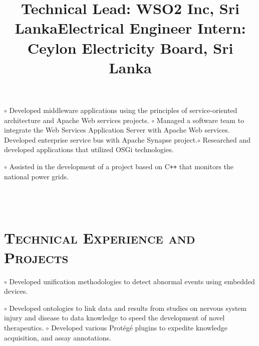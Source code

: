 \begin{resume}
\title{\textbf{Technical Lead: WSO2 Inc, Sri Lanka}}
\begin{position}
$\circ$ Developed middleware applications using the principles of service-oriented 
architecture and Apache Web services projects.   \newline $\circ$ 
Managed a software team to integrate the Web Services Application Server with Apache Web services. 
Developed enterprise service bus with Apache Synapse project.\newline $\circ$ Researched and 
developed 
applications that utilized OSGi technologies.
\end{position}


\title{\textbf{Electrical Engineer Intern: Ceylon Electricity Board, Sri Lanka}}
\begin{position}
$\circ$ Assisted in the development of a project based on C\texttt{++} that monitors the national 
power 
grids. 
\end{position}



\begin{formatb}
  \\
  \body\\
\end{formatb}

\vspace{-2mm}
\section{\textsc{Technical Experience and Projects}}

\begin{position}
$\circ$ Developed  unification methodologies to detect abnormal events using embedded devices.
\end{position}

\begin{position}
$\circ$ Developed ontologies to link data 
and results from studies on nervous system injury and disease to data knowledge to speed the 
development of novel therapeutics. \newline $\circ$ Developed  various Prot\'{e}g\'{e} plugins to 
expedite knowledge acquisition, and assay annotations.
\end{position}


\end{resume}
